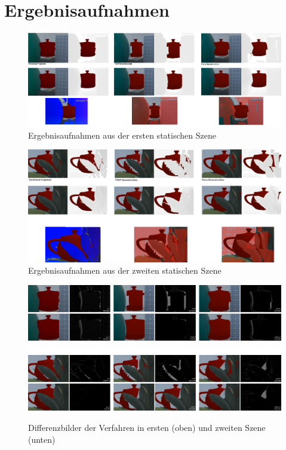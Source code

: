 \chapter{Ergebnisaufnahmen}
\begin{figure}
  \centering
	\includegraphics[width=1.0\textwidth]{content/images/evaluation/static_occlusion.png} 
  \caption{Ergebnisaufnahmen aus der ersten statischen Szene}
  \label{fig:static_occlusion}
\end{figure}

\begin{figure}
  \centering
	\includegraphics[width=1.0\textwidth]{content/images/evaluation/plant_occlusion.png} 
  \caption{Ergebnisaufnahmen aus der zweiten statischen Szene}
  \label{fig:plant_occlusion}
\end{figure}

\begin{figure}
  \centering
	\includegraphics[width=1.0\textwidth]{content/images/evaluation/static_occlusion_results.png} 
	\includegraphics[width=1.0\textwidth]{content/images/evaluation/spacer.png} 
	\includegraphics[width=1.0\textwidth]{content/images/evaluation/plant_occlusion_results.png} 
  \caption{Differenzbilder der Verfahren in ersten (oben) und zweiten Szene (unten)}
  \label{fig:static_occlusion_results}
\end{figure}

